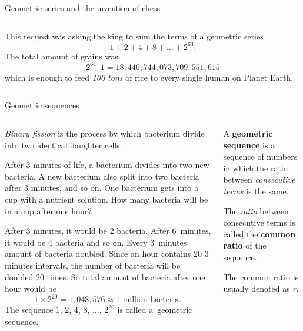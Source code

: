 \documentclass[9pt,aspectratio=169]{beamer}
\begin{document}
\begin{frame}{Geometric series and the invention of chess}
\begin{columns}[T]
\begin{column}{0.5\textwidth}
      \begin{example}
        This request was asking the king to sum the terms of a geometric series
        \[ 1 + 2 + 4 + 8 + \ldots + 2^{63}. \]
        The total amount of grains was
        \[ 2^{64} – 1 = 18{,}446{,}744{,}073{,}709{,}551{,}615 \]which is enough to feed \emph{100 tons} of rice to every single human on Planet Earth.
      \end{example}
    \end{column}
  \end{columns}
\end{frame}

\begin{frame}{Geometric sequences}
  \begin{columns}[T]
    \begin{column}{0.5\textwidth}
      \emph{Binary fission} is the process by which bacterium divide into two identical daughter cells.

      \begin{problem}
        After $3$ minutes of life, a bacterium divides into two new bacteria. A new bacterium also split into two bacteria after $3$ minutes, and so on. One bacterium gets into a cup with a nutrient solution. How many bacteria will be in a cup after one hour?
      \end{problem}

      After $3$ minutes, it would be $2$ bacteria. After $6$~minutes, it would be $4$ bacteria and so on. Every $3$~minutes amount of bacteria doubled. Since an hour contains $20$ $3$ minutes intervals, the number of bacteria will be doubled $20$ times. So total amount of bacteria after one hour would be 
      \[ 1 \times 2^{20} = 1{,}048{,}576 \approx 1 \text{ million bacteria.} \]
      The sequence $1$, $2$, $4$, $8$, $\ldots$, $2^{20}$ is called a~geometric sequence.
    \end{column}
    \begin{column}{0.5\textwidth}
      \begin{definition}
        A \textbf{geometric sequence} is a sequence of numbers in which the ratio between \emph{consecutive terms} is the same.
        
        The \emph{ratio} between consecutive terms is called the \textbf{common ratio} of the sequence. 
      \end{definition}
      The common ratio is usually denoted as $r$.


\end{column}
\end{columns}
\end{frame}
\end{document}

